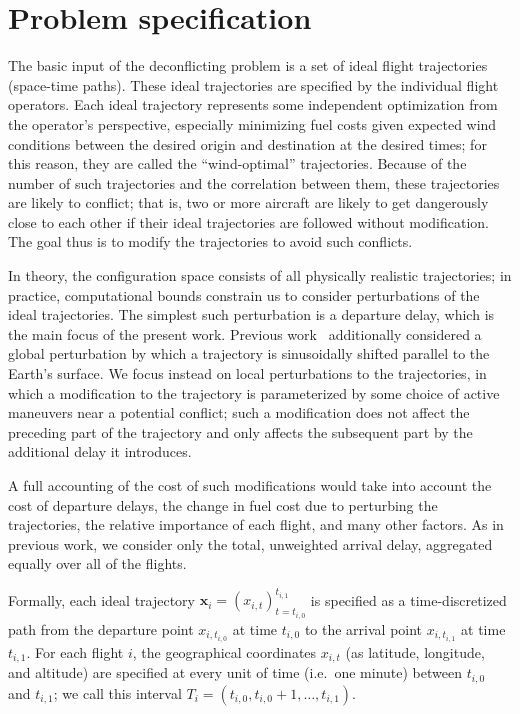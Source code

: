\section{Problem specification}

The basic input of the deconflicting problem is a set of ideal flight trajectories (space-time paths).
These ideal trajectories are specified by the individual flight operators.
Each ideal trajectory represents some independent optimization from the operator's perspective, especially minimizing fuel costs given expected wind conditions between the desired origin and destination at the desired times;
for this reason, they are called the ``wind-optimal'' trajectories.
Because of the number of such trajectories and the correlation between them, these trajectories are likely to conflict; that is, two or more aircraft are likely to get dangerously close to each other if their ideal trajectories are followed without modification.
The goal thus is to modify the trajectories to avoid such conflicts.

In theory, the configuration space consists of all physically realistic trajectories; in practice, computational bounds constrain us to consider perturbations of the ideal trajectories.
The simplest such perturbation is a departure delay, which is the main focus of the present work.
Previous work~\cite{rodionova16} additionally considered a global perturbation by which a trajectory is sinusoidally shifted parallel to the Earth's surface.
We focus instead on local perturbations to the trajectories, in which a modification to the trajectory is parameterized by some choice of active maneuvers near a potential conflict; such a modification does not affect the preceding part of the trajectory and only affects the subsequent part by the additional delay it introduces.

A full accounting of the cost of such modifications would take into account the cost of departure delays, the change in fuel cost due to perturbing the trajectories, the relative importance of each flight, and many other factors.
As in previous work, we consider only the total, unweighted arrival delay, aggregated equally over all of the flights.

Formally, each ideal trajectory $\mathbf x_i = {\left(x_{i, t}\right)}_{t=t_{i,0}}^{t_{i,1}}$ is specified as a time-discretized path from the departure point $x_{i, t_{i, 0}}$ at time $t_{i, 0}$ to the arrival point $x_{i, t_{i, 1}}$ at time $t_{i, 1}$.
For each flight $i$, the geographical coordinates $x_{i,t}$ (as latitude, longitude, and altitude) are specified at every unit of time (i.e.\ one minute) between $t_{i,0}$ and $t_{i,1}$;
we call this interval $T_i = \left(t_{i,0}, t_{i, 0} + 1, \ldots, t_{i,1}\right)$.

